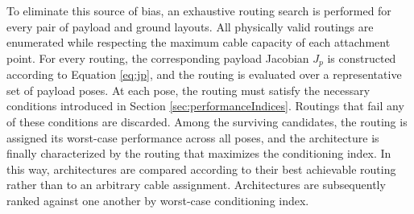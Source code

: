 To eliminate this source of bias, an exhaustive routing search is performed for every pair of payload and ground layouts. All physically valid routings are enumerated while respecting the maximum cable capacity of each attachment point. For every routing, the corresponding payload Jacobian $J_p$ is constructed according to Equation \ref{eq:jp}, and the routing is evaluated over a representative set of payload poses. At each pose, the routing must satisfy the necessary conditions introduced in Section \ref{sec:performanceIndices}. Routings that fail any of these conditions are discarded. Among the surviving candidates, the routing is assigned its worst-case performance across all poses, and the architecture is finally characterized by the routing that maximizes the conditioning index. In this way, architectures are compared according to their best achievable routing rather than to an arbitrary cable assignment. Architectures are subsequently ranked against one another by worst-case conditioning index.

\begin{table}[htbp]
\centering
\small
{}
\caption{Ground Cable Routing and Layout Performance Analysis}
\label{tab:ground_routing_performance}
\end{table}

